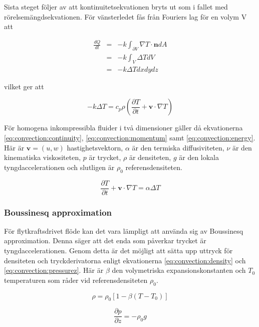 Sista steget följer av att kontinuitetsekvationen bryts ut som i fallet med rörelsemängdsekvationen.
För vänsterledet fås från Fouriers lag för en volym V att

\begin{eqnarray}
\label{reynoldsenergytwo}
\frac{dQ}{dt} & = & -k \int_{\partial V} \nabla T \cdot \mathbf{n} dA \nonumber\\
& = & -k \int_V \Delta T dV \nonumber \\
& = & -k \Delta T dxdydz
\end{eqnarray}

vilket ger att

\begin{equation}
\label{reynoldsenergyalmost}
-k \Delta T = c_p \rho \left( \frac{\partial T}{\partial t} + \mathbf{v}\cdot \nabla T\right)
\end{equation}

För homogena inkompressibla fluider i två dimensioner gäller då ekvationerna
\eqref{eq:convection:continuity}, \eqref{eq:convection:momentum} samt \eqref{eq:convection:energy}. Här
är $\mathbf{v} = (u,w)$ hastighetsvektorn, $\alpha$ är den termiska
diffusiviteten, $\nu$ är den kinematiska viskositeten, $p$ är trycket,
$\rho$ är densiteten, $g$ är den lokala tyngdaccelerationen
och slutligen är $\rho_0$ referensdensiteten.

\begin{equation}
\label{eq:convection:energy}
\frac{\partial T}{\partial t} + \mathbf{v}\cdot\nabla T = \alpha\Delta T
\end{equation}

\subsubsection{Boussinesq approximation}

För flytkraftsdrivet flöde kan det vara lämpligt att använda sig av
Boussinesq approximation. Denna säger att det enda som påverkar trycket är
tyngdaccelerationen. Genom detta är det möjligt att sätta upp uttryck för densiteten
och tryckderivatorna enligt ekvationerna \eqref{eq:convection:density}
och \eqref{eq:convection:pressurez}. Här är
$\beta$ den volymetriska expansionskonstanten och
$T_0$ temperaturen som råder vid referensdensiteten $\rho_0$.

\begin{equation}
\label{eq:convection:density}
\rho = \rho_0[1-\beta(T-T_0)]
\end{equation}

\begin{equation}
\label{eq:convection:pressurez}
\frac{\partial p}{\partial z} = -\rho_0g
\end{equation}


